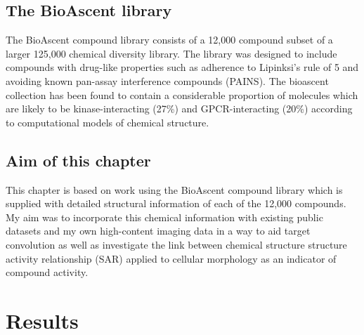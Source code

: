 \documentclass[a4paper,11pt,twoside,openright]{scrbook}
\begin{document}

\subsection{The BioAscent library}
The BioAscent compound library consists of a 12,000 compound subset of a larger 125,000 chemical diversity library.
The library was designed to include compounds with drug-like properties such as adherence to Lipinksi's rule of 5 and avoiding known pan-assay interference compounds (PAINS).
The bioascent collection has been found to contain a considerable proportion of molecules which are likely to be kinase-interacting (27\%) and GPCR-interacting (20\%) according to computational models of chemical structure.


\subsection{Aim of this chapter}
This chapter is based on work using the BioAscent compound library which is supplied with detailed structural information of each of the 12,000 compounds.
My aim was to incorporate this chemical information with existing public datasets and my own high-content imaging data in a way to aid target convolution as well as investigate the link between chemical structure structure activity relationship (SAR) applied to cellular morphology as an indicator of compound activity.








\section{Results}



\end{document}
